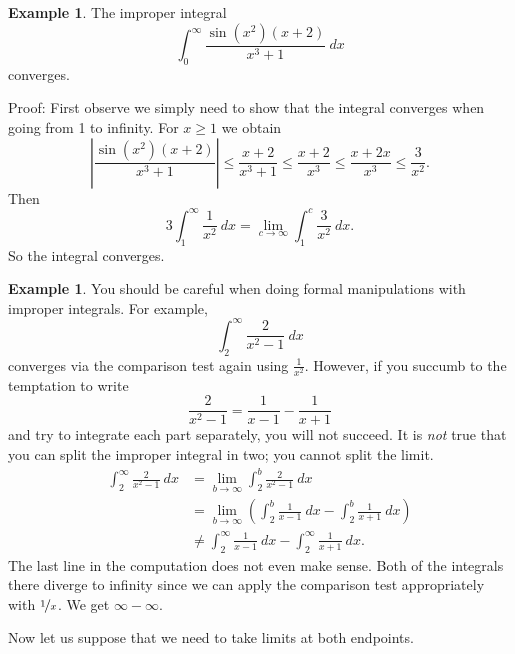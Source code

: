 \documentclass[12pt]{book}
\newcommand{\abs}[1]{\left\lvert {#1} \right\rvert}
\theoremstyle{plain}
\theoremstyle{remark}
\theoremstyle{definition}
\theoremstyle{exercise}
\theoremstyle{example}
\newtheorem{example}[thm]{Example}
\begin{document}
\begin{example}
The improper integral
\begin{equation*}
\int_0^\infty \frac{\sin(x^2)(x+2)}{x^3+1} ~dx
\end{equation*}
converges.

Proof:  First observe we simply need to show
that the integral converges when going from 1 to infinity.
For $x \geq 1$ we obtain
\begin{equation*}
\abs{\frac{\sin(x^2)(x+2)}{x^3+1}}
\leq
\frac{x+2}{x^3+1}
\leq \frac{x+2}{x^3} \leq
\frac{x+2x}{x^3} \leq \frac{3}{x^2} .
\end{equation*}
Then
\begin{equation*}
3 \int_1^\infty \frac{1}{x^2}~dx
=
\lim_{c\to\infty} \int_1^c \frac{3}{x^2} ~dx.
\end{equation*}
So the integral converges.
\end{example}

\begin{example}
You should be careful when doing formal manipulations with improper
integrals.
For example,
\begin{equation*}
\int_2^\infty \frac{2}{x^2-1}~dx
\end{equation*}
converges via the comparison test again using $\frac{1}{x^2}$.  However, if you
succumb to the temptation to write
\begin{equation*}
\frac{2}{x^2-1} = 
\frac{1}{x-1}
-
\frac{1}{x+1} 
\end{equation*}
and try to integrate each part separately, you will not succeed.
It is \emph{not} true that you can split the improper
integral in two; you cannot split the limit.
\begin{equation*}
\begin{split}
\int_2^\infty \frac{2}{x^2-1} ~dx &=
\lim_{b\to \infty} \int_2^b \frac{2}{x^2-1} ~dx
\\
&=
\lim_{b\to \infty}
\left(
\int_2^b \frac{1}{x-1}~dx
-
\int_2^b \frac{1}{x+1}~dx
\right)
\\
&\not=
\int_2^\infty \frac{1}{x-1}~dx
-
\int_2^\infty \frac{1}{x+1}~dx .
\end{split}
\end{equation*}
The last line in the computation does not even make sense.  Both of the
integrals there diverge to infinity since we can
apply the comparison test appropriately with
$\nicefrac{1}{x}$.  We get $\infty - \infty$.
\end{example}

Now let us suppose that we need to take limits at both endpoints.
\end{document}
